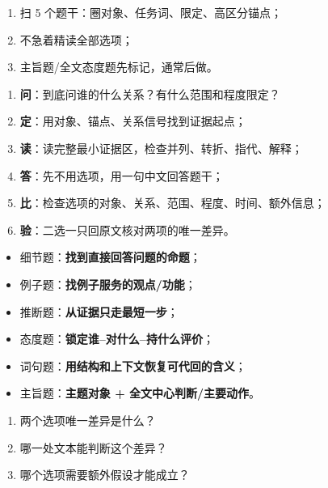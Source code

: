 \documentclass[11pt,a4paper]{ctexart}
\newcommand{\kw}[1]{\textbf{#1}}
\begin{document}
\begin{corebox}[整篇开始前]
\begin{enumerate}
  \item 扫 5 个题干：圈对象、任务词、限定、高区分锚点；
  \item 不急着精读全部选项；
  \item 主旨题/全文态度题先标记，通常后做。
\end{enumerate}
\end{corebox}

\begin{exam}[每一道题：问--定--读--答--比--验]
\begin{enumerate}
  \item \kw{问}：到底问谁的什么关系？有什么范围和程度限定？
  \item \kw{定}：用对象、锚点、关系信号找到证据起点；
  \item \kw{读}：读完整最小证据区，检查并列、转折、指代、解释；
  \item \kw{答}：先不用选项，用一句中文回答题干；
  \item \kw{比}：检查选项的对象、关系、范围、程度、时间、额外信息；
  \item \kw{验}：二选一只回原文核对两项的唯一差异。
\end{enumerate}
\end{exam}

\begin{statebox}[六类题型只记一个核心动作]
\begin{itemize}
  \item 细节题：\kw{找到直接回答问题的命题}；
  \item 例子题：\kw{找例子服务的观点/功能}；
  \item 推断题：\kw{从证据只走最短一步}；
  \item 态度题：\kw{锁定谁--对什么--持什么评价}；
  \item 词句题：\kw{用结构和上下文恢复可代回的含义}；
  \item 主旨题：\kw{主题对象 + 全文中心判断/主要动作}。
\end{itemize}
\end{statebox}

\begin{method}[二选一只问三件事]
\begin{enumerate}
  \item 两个选项唯一差异是什么？
  \item 哪一处文本能判断这个差异？
  \item 哪个选项需要额外假设才能成立？
\end{enumerate}
\end{method}
\end{document}
